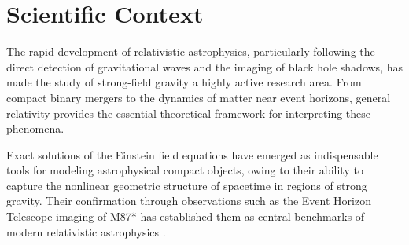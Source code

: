 \begin{center}
\end{center}

\section*{Scientific Context}

The rapid development of relativistic astrophysics, particularly following the direct detection of gravitational waves and the imaging of black hole shadows, has made the study of strong-field gravity a highly active research area. From compact binary mergers to the dynamics of matter near event horizons, general relativity provides the essential theoretical framework for interpreting these phenomena.

Exact solutions of the Einstein field equations have emerged as indispensable tools for modeling astrophysical compact objects, owing to their ability to capture the nonlinear geometric structure of spacetime in regions of strong gravity. Their confirmation through observations such as the Event Horizon Telescope imaging of M87* has established them as central benchmarks of modern relativistic astrophysics \cite{eht2019}.

\perfectdivider
